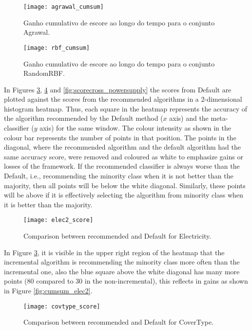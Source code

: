 \begin{figure}[!t]
    \centering
    \texttt{[image: agrawal\_cumsum]}
    \caption{Ganho cumulativo de escore ao longo do tempo para o conjunto Agrawal.}
    \label{fig:cumsum_agrawal}
\end{figure}

\begin{figure}[!t]
    \centering
    \texttt{[image: rbf\_cumsum]}
    \caption{Ganho cumulativo de escore ao longo do tempo para o conjunto RandomRBF.}
    \label{fig:cumsum_rbf}
\end{figure}

In Figures \ref{fig:scorecross_elec2}, \ref{fig:scorecross_covtype} and \ref{fig:scorecross_powersupply} the scores from Default are plotted against the scores from the recommended algorithms in a 2-dimensional histogram heatmap.
Thus, each square in the heatmap represents the accuracy of the algorithm recommended by the Default method ($x$ axis) and the meta-classifier ($y$ axis) for the same window. The colour intensity as shown in the colour bar represents the number of points in that position. The points in the diagonal, where the recommended algorithm and the default algorithm had the same accuracy score, were removed and coloured as white to emphasize gains or losses of the framework.
If the recommended classifier is always worse than the Default, i.e., recommending the minority class when it is not better than the majority, then all points will be below the white diagonal. Similarly, these points will be above if it is effectively selecting the algorithm from minority class when it is better than the majority.

\begin{figure}[!t]
    \centering
    \texttt{[image: elec2\_score]}
    \caption{Comparison between recommended and Default for Electricity.}
    \label{fig:scorecross_elec2}
\end{figure}

In Figure \ref{fig:scorecross_elec2}, it is visible in the upper right region of the heatmap that the incremental algorithm is recommending the minority class more often than the incremental one, also the blue square above the white diagonal has many more points (80 compared to 30 in the non-incremental), this reflects in gains as shown in Figure \ref{fig:cumsum_elec2}.

\begin{figure}[!t]
    \centering
    \texttt{[image: covtype\_score]}
    \caption{Comparison between recommended and Default for CoverType.}
    \label{fig:scorecross_covtype}
\end{figure}

